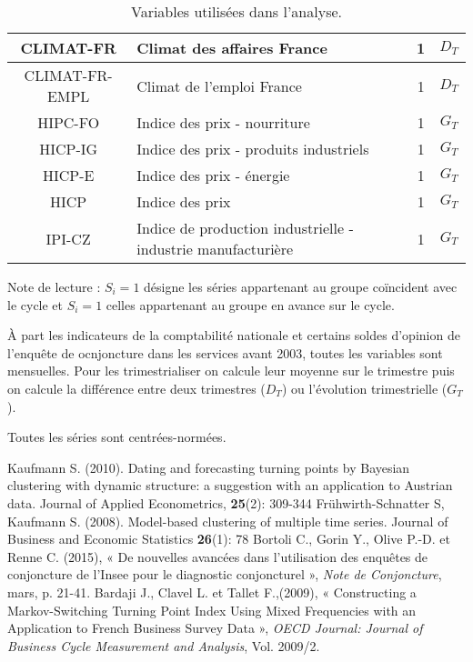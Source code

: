 \documentclass[10pt,french,french]{article}
\begin{document}
\begin{table}[h]
{\begin{tabular}{ | c | p{10cm} | c|c|}
     CLIMAT-FR & Climat des affaires France & 1 & $D_T$\\ \hline
     CLIMAT-FR-EMPL & Climat de l'emploi France  & 1 & $D_T$\\ \hline
     HIPC-FO & Indice des prix - nourriture & 1 & $G_T$\\ \hline
     HICP-IG & Indice des prix - produits industriels & 1 & $G_T$\\ \hline
     HICP-E & Indice des prix - énergie & 1 & $G_T$\\ \hline
     HICP & Indice des prix & 1 & $G_T$\\ \hline
     IPI-CZ & Indice de production industrielle - industrie manufacturière & 1& $G_T$ \\
     \hline
   \end{tabular}
   \caption{Variables utilisées dans l'analyse.}\label{tableau_var}}
  \footnotesize
Note de lecture : $S_i=1$ désigne les séries appartenant au groupe coïncident avec le cycle et $S_i=1$ celles appartenant au groupe en avance sur le cycle.

À part les indicateurs de la comptabilité nationale et certains soldes d'opinion de l'enquête de ocnjoncture dans les services avant 2003, toutes les variables sont mensuelles. Pour les trimestrialiser on calcule leur moyenne sur le trimestre puis on calcule la différence entre deux trimestres ($D_T$) ou l'évolution trimestrielle ($G_T$).

Toutes les séries sont centrées-normées.
\end{table}

\newpage

\nocite{*}

\begin{thebibliography}{999}
 Kaufmann S. (2010). Dating and forecasting turning points by Bayesian clustering with dynamic structure: a suggestion with an application to Austrian data. Journal of Applied Econometrics, \textbf{25}(2): 309-344 
 Frühwirth-Schnatter S, Kaufmann S. (2008). Model-based clustering of multiple time series. Journal of Business and Economic Statistics \textbf{26}(1): 78
 Bortoli C., Gorin Y., Olive P.-D. et Renne C. (2015), « De nouvelles avancées dans l’utilisation des enquêtes de conjoncture de l’Insee pour le diagnostic conjoncturel », \emph{Note de Conjoncture}, mars, p. 21-41.
 Bardaji J., Clavel L. et Tallet F.,(2009), « Constructing a Markov-Switching Turning Point Index Using Mixed Frequencies with an Application to French Business Survey Data », \emph{OECD Journal: Journal of Business Cycle Measurement and Analysis}, Vol. 2009/2.
\end{thebibliography}
\end{document}
